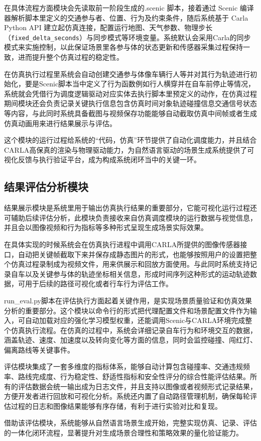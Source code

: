 在具体流程方面模块会先读取前一阶段生成的.scenic 脚本，接着通过 Scenic 编译器解析脚本里定义的交通参与者、位置、行为及约束条件，随后系统基于 Carla Python API 建立起仿真连接，配置运行地图、天气参数、物理步长（\texttt{fixed\_delta\_seconds}）与同步模式等环境变量。系统默认会采用Carla的同步模式来实施控制，以此保证场景里各参与体的状态更新和传感器采集过程保持一致，进而提升整个仿真过程的稳定性。

在仿真执行过程里系统会自动创建交通参与体像车辆行人等并对其行为轨迹进行初始化，要是Scenic脚本当中定义了行为函数例如行人横穿并在自车前停止等情况，系统就会凭借行为调度逻辑驱动对应实体去执行脚本里预定义的动作，在仿真过程期间模块还会负责记录关键执行信息包含仿真时间对象轨迹碰撞信息交通信号状态等内容，与此同时系统具备截图与视频保存功能能够自动截取仿真中间帧或者生成仿真动画用来进行结果展示与评估。

这个模块的运行过程给系统的“代码，仿真”环节提供了自动化调度能力，并且结合CARLA高保真的渲染与物理驱动能力，为自然语言驱动的场景生成系统提供了可视化反馈与执行验证平台，成为构成系统闭环当中的关键一环。

\subsection{结果评估分析模块}

结果展示模块是系统里用于输出仿真执行结果的重要部分，它能可视化运行过程还可辅助后续评估分析，此模块负责接收来自仿真调度模块的运行数据与视觉信息，并且会以图像视频和行为指标等多种形式呈现生成场景实际效果。

在具体实现的时候系统会在仿真执行进程中调用CARLA所提供的图像传感器接口，自动把关键帧截取下来并保存成静态图片的形式，也能够按照用户的设置把整个仿真过程录制成为视频文件，用来供展示和回放方面使用。与此同时系统支持记录自车以及关键参与体的轨迹坐标相关信息，形成时间序列这种形式的运动轨迹数据，可用于后续的路径可视化或者行车行为评估工作。

run\_eval.py脚本在评估执行方面起着关键作用，是实现场景质量验证和仿真效果分析的重要部分。这个模块以命令行的形式把代理配置文件和场景配置文件作为输入，可自动加载对应的强化学习模型权重，还能调用Scenic与CARLA环境完成整个仿真执行流程。在仿真的过程中，系统会详细记录自车行为和环境交互的数据，涵盖轨迹、速度、加速度以及转向变化等方面的信息，同时会监控碰撞、闯红灯、偏离路线等关键事件。

评估模块集成了一套多维度的指标体系，能够自动计算包含碰撞率、交通违规频率、路线完成度、行为稳定性、舒适性指标和安全性评分的综合性能评估结果。所有的评估数据会统一输出成为日志文件，并且支持以图像或者视频形式记录结果，方便开发者进行回放和可视化分析。系统还内置了自动路径管理机制，确保每轮评估过程的日志和图像结果能够有序存储，有利于进行实验对比和复现。

借助该评估模块，系统能够从自然语言场景生成开始，完整实现仿真、记录、评估的一体化闭环流程，显著提升对生成场景合理性和策略效果的量化验证能力。




